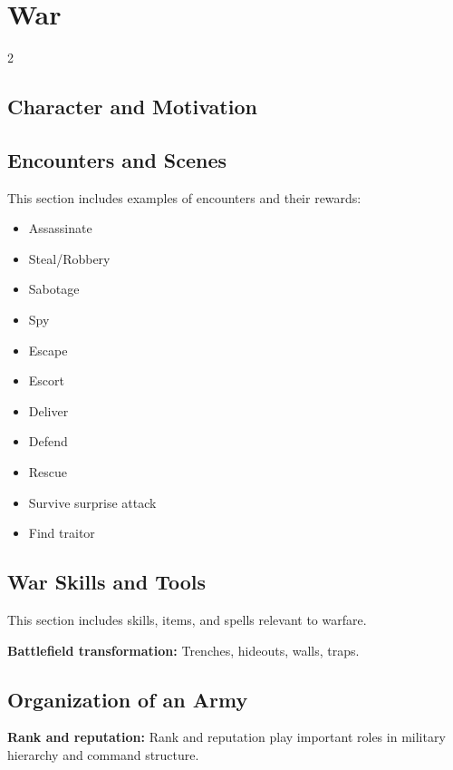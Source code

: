 \chapter{War}

\begin{multicols}{2}

\section{Character and Motivation}


\section{Encounters and Scenes}

This section includes examples of encounters and their rewards:

\begin{itemize}
    \setlength\itemsep{0em}
    \setlength{\parskip}{0em}
    \item Assassinate
    \item Steal/Robbery
    \item Sabotage
    \item Spy
    \item Escape
    \item Escort
    \item Deliver
    \item Defend
    \item Rescue
    \item Survive surprise attack
    \item Find traitor
\end{itemize}

\section{War Skills and Tools}

This section includes skills, items, and spells relevant to warfare.

\textbf{Battlefield transformation:} Trenches, hideouts, walls, traps.

\section{Organization of an Army}

\textbf{Rank and reputation:} Rank and reputation play important roles in military hierarchy and command structure.


\end{multicols}
